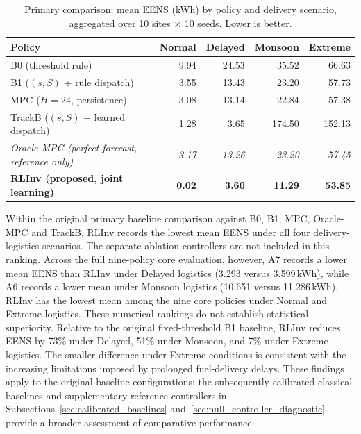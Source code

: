 

\begin{table}[htb]
\centering
\small
\caption{Primary comparison: mean EENS (kWh) by policy and delivery
scenario, aggregated over 10 sites $\times$ 10 seeds. Lower is better.}
\label{tab:primary_comparison}
\begin{tabular}{p{5.2cm}rrrr}
\toprule
Policy & Normal & Delayed & Monsoon & Extreme \\
\midrule
B0 (threshold rule) & 9.94 & 24.53 & 35.52 & 66.63 \\
B1 ($(s,S)$ + rule dispatch) & 3.55 & 13.43 & 23.20 & 57.73 \\
MPC ($H{=}24$, persistence) & 3.08 & 13.14 & 22.84 & 57.38 \\
TrackB ($(s,S)$ + learned dispatch) & 1.28 & 3.65 & 174.50 & 152.13 \\
\midrule
\textit{Oracle-MPC (perfect forecast, reference only)} & \textit{3.17} & \textit{13.26} & \textit{23.20} & \textit{57.45} \\
\midrule
\textbf{RLInv (proposed, joint learning)} & \textbf{0.02} & \textbf{3.60} & \textbf{11.29} & \textbf{53.85} \\
\bottomrule
\end{tabular}
\end{table}


\begin{revisedblock}
Within the original primary baseline comparison
against B0, B1, MPC, Oracle-MPC and TrackB,
RLInv records the lowest mean EENS under all
four delivery-logistics scenarios. The separate
ablation controllers are not included in
this ranking. Across the full nine-policy core evaluation,
however, A7 records a lower mean EENS than
RLInv under Delayed logistics (3.293 versus
3.599\,kWh), while A6 records a lower mean
under Monsoon logistics (10.651 versus
11.286\,kWh). RLInv has the lowest mean among
the nine core policies under Normal and
Extreme logistics. These numerical rankings
do not establish statistical superiority. Relative to the original fixed-threshold B1
baseline, RLInv reduces EENS by 73\% under Delayed,
51\% under Monsoon, and 7\% under Extreme logistics.
The smaller difference under Extreme conditions is
consistent with the increasing limitations imposed by
prolonged fuel-delivery delays. 
These findings apply
to the original baseline configurations; the
subsequently calibrated classical baselines and
supplementary reference controllers in
Subsections~\ref{sec:calibrated_baselines}
and~\ref{sec:null_controller_diagnostic}
provide a broader assessment of comparative
performance.
\end{revisedblock}


